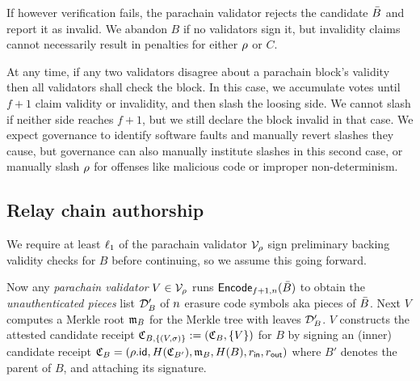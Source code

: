 If however verification fails, the parachain validator rejects the candidate $\bar{B}$ and report it as invalid.  We abandon $B$ if no validators sign it, but invalidity claims cannot necessarily result in penalties for either $\rho$ or $C$.  

At any time, if any two validators disagree about a parachain block's validity then all validators shall check the block.  In this case, we accumulate votes until $f+1$ claim validity or invalidity, and then slash the loosing side.  We cannot slash if neither side reaches $f+1$, but we still declare the block invalid in that case.  We expect governance to identify software faults and manually revert slashes they cause, but governance can also manually institute slashes in this second case, or manually slash $\rho$ for offenses like malicious code or improper non-determinism. 


\subsection{Relay chain authorship} %
\label{sec:backing}


We require at least $\ell_1$ of the parachain validator $\mathcal{V}_{\rho}$ sign preliminary backing validity checks for $B$ before continuing, so we assume this going forward.

Now any {\em parachain validator} $V \in \mathcal{V}_{\rho}$ runs $\mathsf{Encode}_{f+1,n}(\bar{B})$ to obtain the {\em unauthenticated pieces} list $\mathcal{D}'_B$ of $n$ erasure code symbols aka pieces of $\bar{B}$.  Next $V$ computes a Merkle root $\mathfrak{m}_B$ for the Merkle tree with leaves $\mathcal{D}'_B$.  $V$ constructs the attested candidate receipt $\mathfrak{C}_{B,\{(V,\sigma)\}} := (\mathfrak{C}_{B},\{V\})$ for $B$ by signing an (inner) candidate receipt $\mathfrak{C}_B = (\rho.\mathsf{id},H(\mathfrak{C}_{B'}),\mathfrak{m}_B,H(B),r_{\mathsf{in}},r_{\mathsf{out}})$ where $B'$ denotes the parent of $B$, and attaching its signature.  

